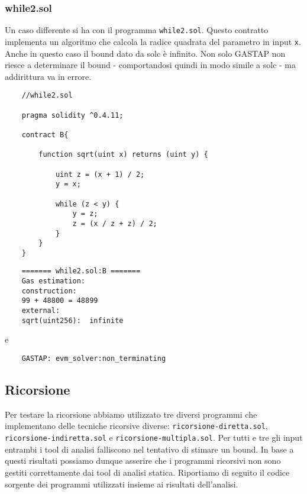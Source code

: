     \subsubsection{while2.sol}
    
    Un caso differente si ha con il programma \verb|while2.sol|.
    Questo contratto implementa un algoritmo che calcola la radice quadrata del parametro in input \verb|x|. Anche in questo caso il bound dato da solc è infinito. Non solo GASTAP non riesce a determinare il bound - comportandosi quindi in modo simile a solc - ma addirittura va in errore.
    
    \begin{minipage}{\linewidth}
    \begin{lstlisting}
    //while2.sol

    pragma solidity ^0.4.11;

    contract B{

        function sqrt(uint x) returns (uint y) {
        
            uint z = (x + 1) / 2;
            y = x;
            
            while (z < y) {
                y = z;
                z = (x / z + z) / 2;
            }
        }
    }
    \end{lstlisting}
    \end{minipage}
    

    \begin{minipage}{\linewidth}
    \begin{lstlisting}
    ======= while2.sol:B =======
    Gas estimation:
    construction:
    99 + 48800 = 48899
    external:
    sqrt(uint256):	infinite
    \end{lstlisting}
    \end{minipage}

    
    e 
    \begin{lstlisting} 
    GASTAP: evm_solver:non_terminating
    \end{lstlisting}

    
    \newpage

    \subsection{Ricorsione}
    
    Per testare la ricorsione abbiamo utilizzato tre diversi programmi che implementano delle tecniche ricorsive diverse:
    \verb|ricorsione-diretta.sol|, \verb|ricorsione-indiretta.sol| e \verb|ricorsione-multipla.sol|. Per tutti e tre gli input entrambi i tool di analisi falliscono nel tentativo di stimare un bound. In base a questi risultati possiamo dunque asserire che i programmi ricorsivi non sono gestiti correttamente dai tool di analisi statica.\newline
    \indent Riportiamo di seguito il codice sorgente dei programmi utilizzati insieme ai risultati dell'analisi.\newline

